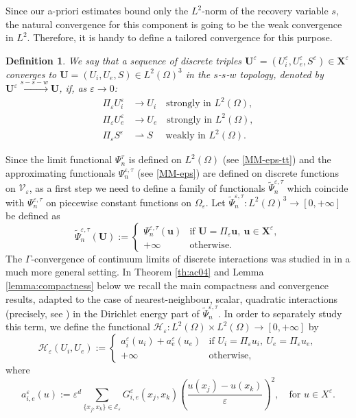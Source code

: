 \documentclass[a4paper,11pt]{article}
\newtheorem{definition}[theorem]{Definition}
\theoremstyle{definition}
\numberwithin{equation}{section}
\newcommand{\e}{\varepsilon}
\newcommand{\V}{\mathcal{V}}
\begin{document}
Since our a-priori estimates bound only the $L^2$-norm of the recovery variable $s$, the natural convergence for this component is going to be the weak convergence in $L^2$. Therefore, it is handy to define a tailored convergence for this purpose.
\begin{definition} 
	We say that a sequence of discrete triples $\mathbf{U}^\e = (U_i^\e, U_e^\e, S^\e)\in \mathbf{X}^\e$ converges to $\mathbf{U} = (U_i, U_e, S)\in L^2(\Omega)^3$ in the $s$-$s$-$w$ topology, denoted by $\mathbf{U}^\e \xrightarrow{s-s-w} \mathbf{U}$, if, as $\e \to 0$:
	\begin{align*}
		\Pi_\e U_i^\e &\to U_i \quad \text{strongly in } L^2(\Omega), \\
		\Pi_\e U_e^\e &\to U_e \quad \text{strongly in } L^2(\Omega), \\
		\Pi_\e S^\e &\rightharpoonup S \quad \text{ weakly in } L^2(\Omega).
	\end{align*}
\end{definition}


Since the limit functional $\Psi_n^\tau$ is defined on $L^2(\Omega)$ (see \eqref{MM-eps-tt}) and the approximating functionals $\Psi_n^{\e,\tau}$ (see \eqref{MM-eps}) are defined on discrete functions on $\V_\e$, as a first step we need to define a family of functionals $\widetilde{\Psi}_n^{\e,\tau}$ which coincide with $\Psi_n^{\e,\tau}$ on piecewise constant functions on $\Omega_\e$. Let $\widetilde{\Psi}_n^{\e,\tau}:  L^2(\Omega)^3 \to [0,+\infty]$ be defined as
\begin{equation}
	\label{def:psitilde}
	\widetilde{\Psi}_n^{\e,\tau}(\mathbf{U}):=
	\begin{cases}
		\Psi_n^{\e,\tau}(\mathbf{u}) &\text{if } \mathbf{U}=\Pi_\e \mathbf{u},\ \mathbf{u}\in \mathbf{X}^\e, \\
		+\infty &\text{otherwise}.
	\end{cases}
\end{equation}
The $\Gamma$-convergence of continuum limits of discrete interactions was studied in \cite{AC04} in a much more general setting. In Theorem \ref{th:ac04} and Lemma \ref{lemma:compactness} below we recall the main compactness and convergence results, adapted to the case of nearest-neighbour, scalar, quadratic interactions (precisely, see \cite[Theorem 3.1 and Remark 3.2]{AC04}) in the Dirichlet energy part of $\widetilde{\Psi}_n^{\e,\tau}$. In order to separately study this term, we define the functional $\mathcal{H}_\e : L^2(\Omega) \times L^2(\Omega) \to [0,+\infty]$ by
\begin{equation}
	\label{def:Hepsilon}
	\mathcal{H}_\e(U_i,U_e):=
	\begin{cases}
		a_i^\e(u_i)+a_e^\e(u_e) &\text{if } U_i=\Pi_\e u_i,\ U_e=\Pi_\e u_e, \\
		+\infty &\text{otherwise,}
	\end{cases}
\end{equation}
where
\[
a_{i,e}^\e(u) := \e^d\!\!\!\sum_{\{x_j,x_k\}\in \mathcal{E}_\e} G_{i,e}^\e(x_j,x_k)\left(\frac{u(x_j)-u(x_k)}{\e}\right)^2,\quad \text{for }u\in X^\e. 
\]
\end{document}
